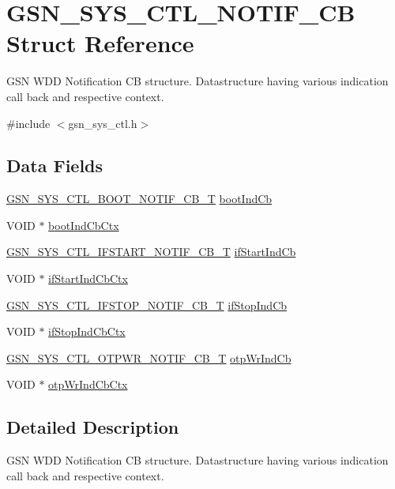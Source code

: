 \hypertarget{a00253}{
\section{GSN\_\-SYS\_\-CTL\_\-NOTIF\_\-CB Struct Reference}
\label{a00253}
}


GSN WDD Notification CB structure. Datastructure having various indication call back and respective context.  




{\ttfamily \#include $<$gsn\_\-sys\_\-ctl.h$>$}

\subsection*{Data Fields}
\begin{DoxyCompactItemize}
\item 
\hyperlink{a00592_a0000f73c2f639831f9499e5106c70b4f}{GSN\_\-SYS\_\-CTL\_\-BOOT\_\-NOTIF\_\-CB\_\-T} \hyperlink{a00253_a81177006545c34a1f1b26662b314e24b}{bootIndCb}
\item 
VOID $\ast$ \hyperlink{a00253_a9a462991fb1432d5d746840a1c0c6da5}{bootIndCbCtx}
\item 
\hyperlink{a00592_a2378a15a57410fa717b24a73398855f4}{GSN\_\-SYS\_\-CTL\_\-IFSTART\_\-NOTIF\_\-CB\_\-T} \hyperlink{a00253_a992a1d58820600ab4aa8881f357397c2}{ifStartIndCb}
\item 
VOID $\ast$ \hyperlink{a00253_ac77f45adf4c13d98b4ed72cff10f25fc}{ifStartIndCbCtx}
\item 
\hyperlink{a00592_a04addc1c242f2d0a18d2a1f21b8379b1}{GSN\_\-SYS\_\-CTL\_\-IFSTOP\_\-NOTIF\_\-CB\_\-T} \hyperlink{a00253_a417d43ab7533336c4d668c9f901ebab7}{ifStopIndCb}
\item 
VOID $\ast$ \hyperlink{a00253_a5f78cc4f4b77ce241da7d95089ca5ccc}{ifStopIndCbCtx}
\item 
\hyperlink{a00592_a0f838274b37f0a1f10e78dca5fcc9e80}{GSN\_\-SYS\_\-CTL\_\-OTPWR\_\-NOTIF\_\-CB\_\-T} \hyperlink{a00253_ac4e9475942d5fa1daee8818d9be41b48}{otpWrIndCb}
\item 
VOID $\ast$ \hyperlink{a00253_a20176e92687bbf50f917b1abb61aa486}{otpWrIndCbCtx}
\end{DoxyCompactItemize}


\subsection{Detailed Description}
GSN WDD Notification CB structure. Datastructure having various indication call back and respective context. 

